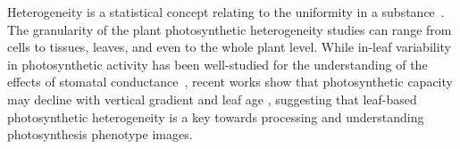 \documentclass{bioinfo}
\begin{document}



Heterogeneity is a statistical concept relating to the uniformity in a substance~\citep{hall2003interpretation}. The granularity of the plant photosynthetic heterogeneity studies can range from cells to tissues, leaves, and even to the whole plant level. While in-leaf variability in photosynthetic activity has been well-studied for the understanding of the effects of stomatal conductance~\citep{Cheeseman1991,Buckley1997}, recent works show that photosynthetic capacity may decline with vertical gradient and leaf age \citep{Kitajima2002,chen2008effect}, suggesting that leaf-based photosynthetic heterogeneity is a key towards processing and understanding photosynthesis phenotype images. %
\end{document}
